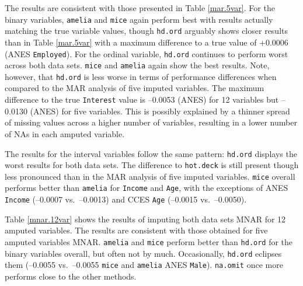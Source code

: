 \documentclass[12pt,econ]{sources/authesis}
\begin{document}
\normalsize

The results are consistent with those presented in Table \ref{mar.5var}. For the binary variables, \texttt{amelia} and \texttt{mice} again perform best with results actually matching the true variable values, though \texttt{hd.ord} arguably shows closer results than in Table \ref{mar.5var} with a maximum difference to a true value of +0.0006 (ANES \texttt{Employed}). For the ordinal variable, \texttt{hd.ord} continues to perform worst across both data sets. \texttt{mice} and \texttt{amelia} again show the best results. Note, however, that \texttt{hd.ord} is less worse in terms of performance differences when compared to the MAR analysis of five imputed variables. The maximum difference to the true \texttt{Interest} value is --0.0053 (ANES) for 12 variables but --0.0130 (ANES) for five variables. This is possibly explained by a thinner spread of missing values across a higher number of variables, resulting in a lower number of NAs in each amputed variable.

The results for the interval variables follow the same pattern: \texttt{hd.ord} displays the worst results for both data sets. The difference to \texttt{hot.deck} is still present though less pronounced than in the MAR analysis of five imputed variables. \texttt{mice} overall performs better than \texttt{amelia} for \texttt{Income} and \texttt{Age}, with the exceptions of ANES \texttt{Income} (--0.0007 vs.~--0.0013) and CCES \texttt{Age} (--0.0015 vs.~--0.0050).

Table \ref{mnar.12var} shows the results of imputing both data sets MNAR for 12 amputed variables. The results are consistent with those obtained for five amputed variables MNAR. \texttt{amelia} and \texttt{mice} perform better than \texttt{hd.ord} for the binary variables overall, but often not by much. Occasionally, \texttt{hd.ord} eclipses them (--0.0055 vs.~--0.0055 \texttt{mice} and \texttt{amelia} ANES \texttt{Male}). \texttt{na.omit} once more performs close to the other methods.

\ssp
\end{document}
